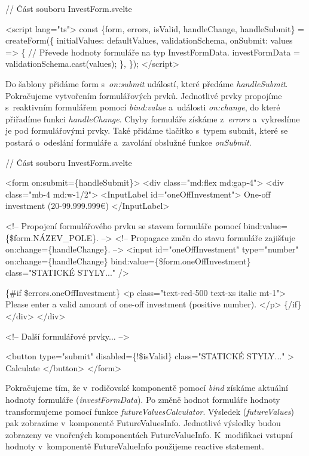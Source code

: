 \begin{prog}
// Část souboru InvestForm.svelte

<script lang="ts">
  const \{form, errors, isValid, handleChange, handleSubmit\} = createForm(\{
    initialValues: defaultValues,
    validationSchema,
    onSubmit: values => \{
      // Převede hodnoty formuláře na typ InvestFormData.
      investFormData = validationSchema.cast(values);
    \},
  \});
</script>
\end{prog}

Do šablony přidáme form s~\emph{on:submit} událostí, které předáme \emph{handleSubmit}. Pokračujeme vytvořením formulářových prvků. 
Jednotlivé prvky propojíme s~reaktivním formulářem pomocí \emph{bind:value} a~události \emph{on:change}, do které přiřadíme funkci \emph{handleChange}. 
Chyby formuláře získáme z~\emph{errors} a~vykreslíme je pod formulářovými prvky. 
Také přidáme tlačítko s~typem submit, které se postará o~odeslání formuláře a~zavolání obslužné funkce \emph{onSubmit}.

\begin{prog}
// Část souboru InvestForm.svelte

<form on:submit=\{handleSubmit\}>
  <div class="md:flex md:gap-4">
    <div class="mb-4 md:w-1/2">
      <InputLabel id="oneOffInvestment">
        One-off investment (20-99.999.999€)
      </InputLabel>

      <!-- Propojení formulářového prvku se stavem formuláře
        pomocí bind:value=\{\$form.NÁZEV_POLE\}. -->
      <!-- Propagace změn do stavu formuláře 
        zajišťuje on:change=\{handleChange\}. -->
      <input
        id="oneOffInvestment"
        type="number"
        on:change=\{handleChange\}
        bind:value=\{\$form.oneOffInvestment\}
        class="STATICKÉ STYLY..."
      />

      \{#if \$errors.oneOffInvestment\}
        <p class="text-red-500 text-xs italic mt-1">
          Please enter a valid amount of one-off investment (positive number).
        </p>
      \{/if\}
    </div>
  </div>

  <!-- Další formulářové prvky... -->

  <button
    type="submit"
    disabled=\{!\$isValid\}
    class="STATICKÉ STYLY..."
  >
    Calculate
  </button>
</form>
\end{prog}

Pokračujeme tím, že v~rodičovské komponentě pomocí \emph{bind} získáme aktuální hodnoty formuláře (\emph{investFormData}). Po změně hodnot formuláře hodnoty transformujeme pomocí funkce \emph{futureValuesCalculator}. 
Výsledek (\emph{futureValues}) pak zobrazíme v~komponentě FutureValuesInfo. Jednotlivé výsledky budou zobrazeny ve vnořených komponentách FutureValueInfo. 
K~modifikaci vstupní hodnoty v~komponentě FutureValueInfo použijeme reactive statement.

